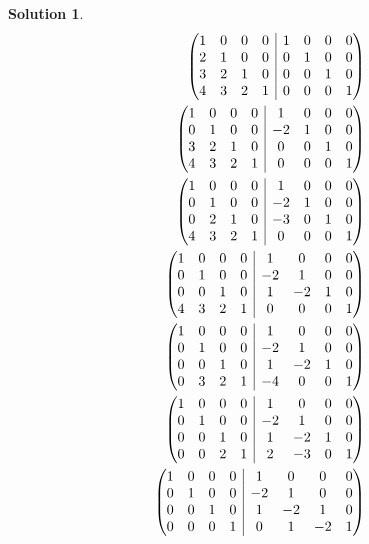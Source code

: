 \documentclass{article}
\newtheorem*{solution}{Solution}
\begin{document}
\begin{solution}
\begin{align*}
\left( \begin{array}{@{}cccc|cccc@{}}
1 & 0 & 0 & 0 & 1 & 0 & 0 & 0 \\
2 & 1 & 0 & 0 & 0 & 1 & 0 & 0 \\
3 & 2 & 1 & 0 & 0 & 0 & 1 & 0 \\
4 & 3 & 2 & 1 & 0 & 0 & 0 & 1
\end{array} \right) \\
\left( \begin{array}{@{}cccc|cccc@{}}
1 & 0 & 0 & 0 & 1 & 0 & 0 & 0 \\
0 & 1 & 0 & 0 & -2 & 1 & 0 & 0 \\
3 & 2 & 1 & 0 & 0 & 0 & 1 & 0 \\
4 & 3 & 2 & 1 & 0 & 0 & 0 & 1
\end{array} \right) \\
\left( \begin{array}{@{}cccc|cccc@{}}
1 & 0 & 0 & 0 & 1 & 0 & 0 & 0 \\
0 & 1 & 0 & 0 & -2 & 1 & 0 & 0 \\
0 & 2 & 1 & 0 & -3 & 0 & 1 & 0 \\
4 & 3 & 2 & 1 & 0 & 0 & 0 & 1
\end{array} \right) \\
\left( \begin{array}{@{}cccc|cccc@{}}
1 & 0 & 0 & 0 & 1 & 0 & 0 & 0 \\
0 & 1 & 0 & 0 & -2 & 1 & 0 & 0 \\
0 & 0 & 1 & 0 & 1 & -2 & 1 & 0 \\
4 & 3 & 2 & 1 & 0 & 0 & 0 & 1
\end{array} \right) \\
\left( \begin{array}{@{}cccc|cccc@{}}
1 & 0 & 0 & 0 & 1 & 0 & 0 & 0 \\
0 & 1 & 0 & 0 & -2 & 1 & 0 & 0 \\
0 & 0 & 1 & 0 & 1 & -2 & 1 & 0 \\
0 & 3 & 2 & 1 & -4 & 0 & 0 & 1
\end{array} \right) \\
\left( \begin{array}{@{}cccc|cccc@{}}
1 & 0 & 0 & 0 & 1 & 0 & 0 & 0 \\
0 & 1 & 0 & 0 & -2 & 1 & 0 & 0 \\
0 & 0 & 1 & 0 & 1 & -2 & 1 & 0 \\
0 & 0 & 2 & 1 & 2 & -3 & 0 & 1
\end{array} \right) \\
\left( \begin{array}{@{}cccc|cccc@{}}
1 & 0 & 0 & 0 & 1 & 0 & 0 & 0 \\
0 & 1 & 0 & 0 & -2 & 1 & 0 & 0 \\
0 & 0 & 1 & 0 & 1 & -2 & 1 & 0 \\
0 & 0 & 0 & 1 & 0 & 1 & -2 & 1
\end{array} \right) \\
\end{align*}


\end{solution}
\end{document}
